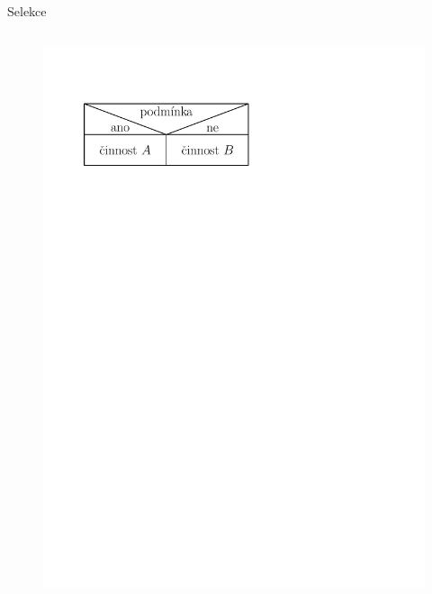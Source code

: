 \documentclass[11pt,aspectratio=169]{beamer}
\begin{document}
\begin{frame}{Selekce}
\begin{columns}
\begin{column}{.5\textwidth}
\begin{figure}
                    \includegraphics[scale=.5]{../images/00-strukturogram-selekce.pdf}
                \end{figure}
            \end{column}
        \end{columns}
    \end{frame}
\end{document}
